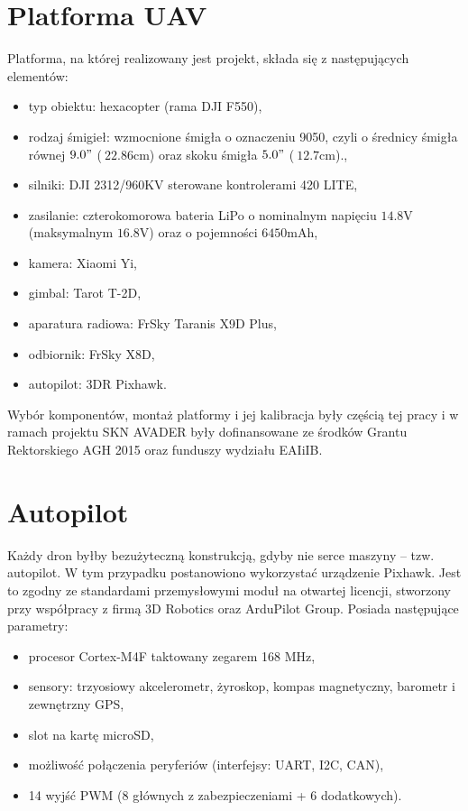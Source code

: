 \section{Platforma UAV}
Platforma, na której realizowany jest projekt, składa się z następujących elementów:
\begin{itemize}
	\item typ obiektu: hexacopter (rama DJI F550),
	\item rodzaj śmigieł: wzmocnione śmigła o oznaczeniu 9050, czyli o średnicy śmigła równej $9.0"$ ($~22.86$cm) oraz skoku śmigła $5.0"$ ($~12.7$cm).,
	\item silniki: DJI 2312/960KV sterowane kontrolerami 420 LITE,
	\item zasilanie: czterokomorowa bateria LiPo o nominalnym napięciu $14.8$V (maksymalnym $16.8$V) oraz o pojemności $6450$mAh,
	\item kamera: Xiaomi Yi,
	\item gimbal: Tarot T-2D,
	\item aparatura radiowa: FrSky Taranis X9D Plus,
	\item odbiornik: FrSky X8D,
	\item autopilot: 3DR Pixhawk.
\end{itemize}

Wybór komponentów, montaż platformy i jej kalibracja były częścią tej pracy i w ramach projektu SKN AVADER były dofinansowane ze środków Grantu Rektorskiego AGH 2015 oraz funduszy wydziału EAIiIB.

\section{Autopilot}

Każdy dron byłby bezużyteczną konstrukcją, gdyby nie serce maszyny -- tzw. autopilot. 
W tym przypadku postanowiono wykorzystać urządzenie Pixhawk. 
Jest to zgodny ze standardami przemysłowymi moduł na otwartej licencji, stworzony przy współpracy z firmą 3D Robotics oraz ArduPilot Group. 
Posiada następujące parametry:
\begin{itemize}
	\item procesor Cortex-M4F taktowany zegarem 168 MHz,
	\item sensory: trzyosiowy akcelerometr, żyroskop, kompas magnetyczny, barometr i zewnętrzny GPS,
	\item slot na kartę microSD,
	\item możliwość połączenia peryferiów (interfejsy: UART, I2C, CAN),
	\item 14 wyjść PWM (8 głównych z zabezpieczeniami + 6 dodatkowych).
\end{itemize}

